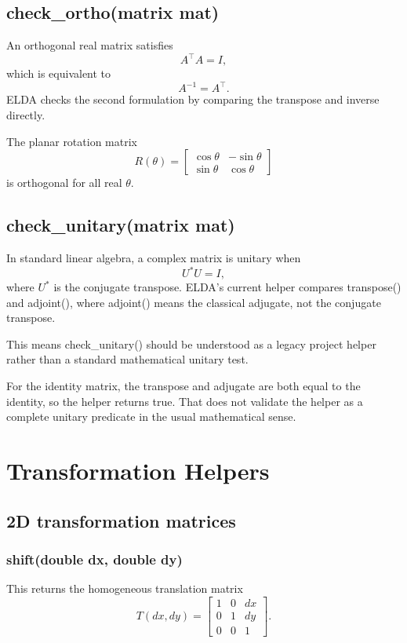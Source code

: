 \documentclass[11pt,a4paper,openany]{book}
\def\code#1{#1}%
\DeclareRobustCommand{\code}[1]{\texttt{\detokenize{#1}}}
\begin{document}
\section{\code{check_ortho(matrix mat)}}
An orthogonal real matrix satisfies
\[
A^\top A = I,
\]
which is equivalent to
\[
A^{-1} = A^\top.
\]
ELDA checks the second formulation by comparing the transpose and inverse directly.

\begin{examplebox}[Example]
The planar rotation matrix
\[
R(\theta) =
\begin{bmatrix}
\cos\theta & -\sin\theta \\
\sin\theta & \cos\theta
\end{bmatrix}
\]
is orthogonal for all real \(\theta\).
\end{examplebox}

\section{\code{check_unitary(matrix mat)}}
In standard linear algebra, a complex matrix is unitary when
\[
U^\ast U = I,
\]
where \(U^\ast\) is the conjugate transpose. ELDA's current helper compares \code{transpose()} and \code{adjoint()}, where \code{adjoint()} means the classical adjugate, not the conjugate transpose.

\begin{techbox}
This means \code{check_unitary()} should be understood as a legacy project helper rather than a standard mathematical unitary test.
\end{techbox}

\begin{examplebox}[Example]
For the identity matrix, the transpose and adjugate are both equal to the identity, so the helper returns \code{true}. That does not validate the helper as a complete unitary predicate in the usual mathematical sense.
\end{examplebox}

\chapter{Transformation Helpers}

\section{2D transformation matrices}
\subsection{\code{shift(double dx, double dy)}}
This returns the homogeneous translation matrix
\[
T(dx,dy) =
\begin{bmatrix}
1 & 0 & dx \\
0 & 1 & dy \\
0 & 0 & 1
\end{bmatrix}.
\]
\end{document}
